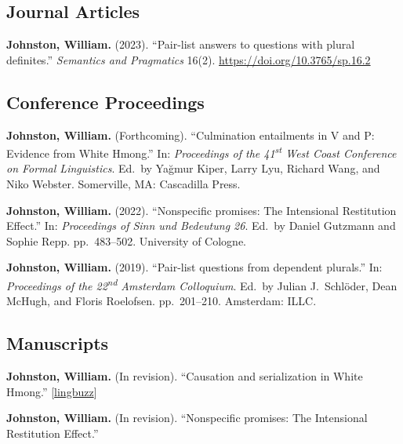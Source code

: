 \documentclass[11pt,oneside,DIV=9,parskip=off]{scrarticle} %
\newlength{\spacingbefore}
\newlength{\spacingafter}
\newcommand{\myonecol}[1]{%
	\vspace{\spacingbefore}%
	\begin{minipage}[t]{\linewidth}%
		\strut#1%
	\end{minipage}%
	\vspace{\spacingafter}\par%
	}
\newcommand{\pub}[1]{%
	\myonecol{#1}%
	}
\begin{document}
\subsection{Journal Articles}
\pub{\textbf{Johnston, William.} (2023). ``Pair-list answers to questions with plural definites.'' \textit{Semantics and Pragmatics} 16(2). \href{https://doi.org/10.3765/sp.16.2}{https://doi.org/10.3765/sp.16.2}}


\subsection{Conference Proceedings}
\pub{\textbf{Johnston, William.} (Forthcoming). ``Culmination entailments in V and P: Evidence from White Hmong.'' In: \textit{Proceedings of the 41\textsuperscript{st} West Coast Conference on Formal Linguistics}. Ed.\ by Yağmur Kiper, Larry Lyu, Richard Wang, and Niko Webster. Somerville, MA: Cascadilla Press.}
\pub{\textbf{Johnston, William.} (2022). ``Nonspecific promises: The Intensional Restitution Effect.'' In: \textit{Proceedings of Sinn und Bedeutung 26}. Ed.\ by Daniel Gutzmann and Sophie Repp. pp.\ 483--502. University of Cologne.}
\pub{\textbf{Johnston, William.} (2019). ``Pair-list questions from dependent plurals.'' In: \textit{Proceedings of the 22\textsuperscript{nd} Amsterdam Colloquium}. Ed.\ by Julian J.\ Schl\"oder, Dean McHugh, and Floris Roelofsen. pp.\ 201--210. Amsterdam: ILLC.}



\subsection{Manuscripts}
\pub{\textbf{Johnston, William.} (In revision). ``Causation and serialization in White Hmong.'' [\href{https://ling.auf.net/lingbuzz/007585}{lingbuzz}]}

\pub{\textbf{Johnston, William.} (In revision). ``Nonspecific promises: The Intensional Restitution Effect.'' %
} 
\end{document}
